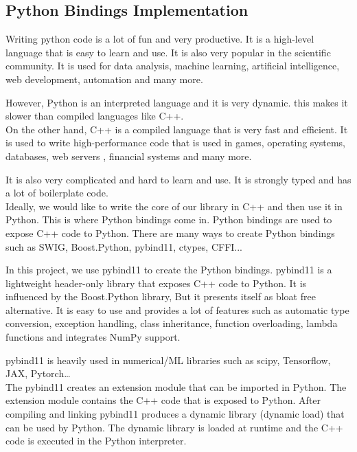 \begin{spacing}{1.2}
    \section{Python Bindings Implementation}
    Writing python code is a lot of fun and very productive. It is a high-level language that is
    easy to learn and use. It is also very popular in the scientific community. It is used for
    data analysis, machine learning, artificial intelligence, web development, automation and many more.

    However, Python is an interpreted language and it is very dynamic. this makes it slower than
    compiled languages like C++. \\

    On the other hand, C++ is a compiled language that is very fast and efficient. It is used to
    write high-performance code that is used in games, operating systems, databases, web servers
    , financial systems and many more.

    It is also very complicated and hard to learn and use. It is strongly typed and has a lot of
    boilerplate code.\\

    Ideally, we would like to write the core of our library in C++ and then use it in Python.
    This is where Python bindings come in. Python bindings are used to expose C++ code to Python.
    There are many ways to create Python bindings such as SWIG, Boost.Python, pybind11, ctypes, CFFI...

    In this project, we use pybind11 to create the Python bindings. pybind11 is a lightweight header-only
    library that exposes C++ code to Python.
    It is influenced by the Boost.Python library, But it presents itself as bloat free alternative.
    It is easy to use and provides a lot of features such as
    automatic type conversion, exception handling, class inheritance, function overloading, lambda functions and
    integrates NumPy support.

    pybind11 is heavily used in numerical/ML libraries such as scipy, Tensorflow, JAX, Pytorch\dots\\

    The pybind11 creates an extension module that can be imported in Python. The extension module
    contains the C++ code that is exposed to Python. After compiling and linking pybind11 produces
    a dynamic library (dynamic load) that can be used by Python. The dynamic library is loaded
    at runtime and the C++ code is executed in the Python interpreter.\\


\end{spacing}
